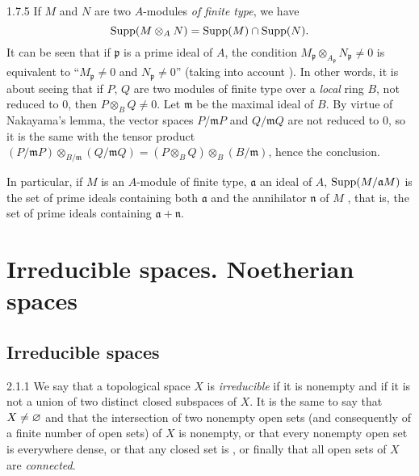 \documentclass[10pt,oneside]{book}
\begin{document}
\begin{env}{1.7.5}
\label{env-0.1.7.5}
If $M$ and $N$ are two $A$-modules \emph{of finite type}, we have
\[
  {\mathop{\mathrm{Supp}}\nolimits}(M\otimes_A N)={\mathop{\mathrm{Supp}}\nolimits}(M)\cap{\mathop{\mathrm{Supp}}\nolimits}(N).
\]
It can be seen that if $\mathfrak{p}$ is a prime ideal of $A$, the condition
$M_\mathfrak{p}\otimes_{A_\mathfrak{p}}N_\mathfrak{p}\neq 0$ is equivalent to
``$M_\mathfrak{p}\neq 0$ and $N_\mathfrak{p}\neq 0$'' (taking into account
). In other words, it is about seeing that if $P$, $Q$ are two modules of
finite type over a \emph{local} ring $B$, not reduced to $0$, then $P\otimes_B Q\neq 0$. Let
$\mathfrak{m}$ be the maximal ideal of $B$. By virtue of Nakayama's lemma, the vector spaces
$P/\mathfrak{m}P$ and $Q/\mathfrak{m}Q$ are not reduced to $0$, so it is the same with the
tensor product
$(P/\mathfrak{m}P)\otimes_{B/\mathfrak{m}}(Q/\mathfrak{m}Q)
  =(P\otimes_B Q)\otimes_B(B/\mathfrak{m})$,
hence the conclusion.

In particular, if $M$ is an $A$-module of finite type, $\mathfrak{a}$ an ideal of $A$,
${\mathop{\mathrm{Supp}}\nolimits}(M/\mathfrak{a}M)$ is the set of prime ideals containing both $\mathfrak{a}$ and the
annihilator $\mathfrak{n}$ of $M$ , that is, the set of prime ideals
containing $\mathfrak{a}+\mathfrak{n}$.
\end{env}

\section{Irreducible spaces. Noetherian spaces}
\label{0-prelim-2}

\subsection{Irreducible spaces}
\label{0-prelim-2.1}

\begin{env}{2.1.1}
\label{env-0.2.1.1}
We say that a topological space $X$ is \emph{irreducible} if it is nonempty and if it is not
a union of two distinct closed subspaces of $X$. It is the same to say that $X\neq\varnothing$ and
that the intersection of two nonempty open sets (and consequently of a finite number of open
sets) of $X$ is nonempty, or that every nonempty open set is everywhere dense, or that any
closed set is , or finally that all open sets of $X$ are
\emph{connected}.
\end{env}
\end{document}
